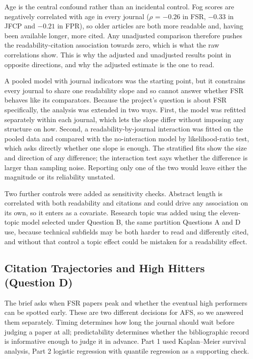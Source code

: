 \documentclass[11pt,a4paper]{article}
\begin{document}
Age is the central confound rather than an incidental control. Fog scores are negatively correlated with age in every journal (\(\rho\) = \(-0.26\) in FSR, \(-0.33\) in JFCP and \(-0.21\) in FPR), so older articles are both more readable and, having been available longer, more cited. Any unadjusted comparison therefore pushes the readability-citation association towards zero, which is what the raw correlations show. This is why the adjusted and unadjusted results point in opposite directions, and why the adjusted estimate is the one to read.

A pooled model with journal indicators was the starting point, but it constrains every journal to share one readability slope and so cannot answer whether FSR behaves like its comparators. Because the project's question is about FSR specifically, the analysis was extended in two ways. First, the model was refitted separately within each journal, which lets the slope differ without imposing any structure on how. Second, a readability-by-journal interaction was fitted on the pooled data and compared with the no-interaction model by likelihood-ratio test, which asks directly whether one slope is enough. The stratified fits show the size and direction of any difference; the interaction test says whether the difference is larger than sampling noise. Reporting only one of the two would leave either the magnitude or its reliability unstated.

Two further controls were added as sensitivity checks. Abstract length is correlated with both readability and citations and could drive any association on its own, so it enters as a covariate. Research topic was added using the eleven-topic model selected under Question B, the same partition Questions A and D use, because technical subfields may be both harder to read and differently cited, and without that control a topic effect could be mistaken for a readability effect.

\subsection{Citation Trajectories and High Hitters (Question D)}\label{citation-trajectories-and-high-hitters-question-d}

The brief asks when FSR papers peak and whether the eventual high performers can be spotted early. These are two different decisions for AFS, so we answered them separately. Timing determines how long the journal should wait before judging a paper at all; predictability determines whether the bibliographic record is informative enough to judge it in advance. Part 1 used Kaplan--Meier survival analysis, Part 2 logistic regression with quantile regression as a supporting check.
\end{document}
